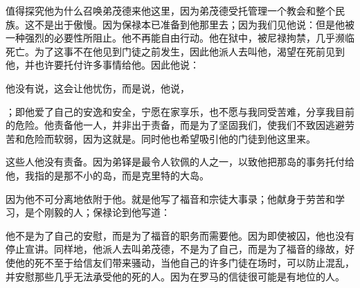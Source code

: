 \par

值得探究他为什么召唤弟茂德来他这里，因为弟茂德受托管理一个教会和整个民族。这不是出于傲慢。因为保禄本已准备到他那里去；因为我们见他说：但是他被一种强烈的必要性所阻止。他不再能自由行动。他在狱中，被尼禄拘禁，几乎濒临死亡。为了这事不在他见到门徒之前发生，因此他派人去叫他，渴望在死前见到他，并也许要托付许多事情给他。因此他说：\par

他没有说，这会让他忧伤，而是说，他说，\par

；即他爱了自己的安逸和安全，宁愿在家享乐，也不愿与我同受苦难，分享我目前的危险。他责备他一人，并非出于责备，而是为了坚固我们，使我们不致因逃避劳苦和危险而软弱，因为这就是。同时他也希望吸引他的门徒到他这里来。\par

\par

这些人他没有责备。因为弟铎是最令人钦佩的人之一，以致他把那岛的事务托付给他，我指的是那不小的岛，而是克里特的大岛。\par

因为他不可分离地依附于他。就是他写了福音和宗徒大事录；他献身于劳苦和学习，是个刚毅的人；保禄论到他写道：\par

\par

他不是为了自己的安慰，而是为了福音的职务而需要他。因为即使被囚，他也没有停止宣讲。同样地，他派人去叫弟茂德，不是为了自己，而是为了福音的缘故，好使他的死不至于给信友们带来骚动，当他自己的许多门徒在场时，可以防止混乱，并安慰那些几乎无法承受他的死的人。因为在罗马的信徒很可能是有地位的人。\par

